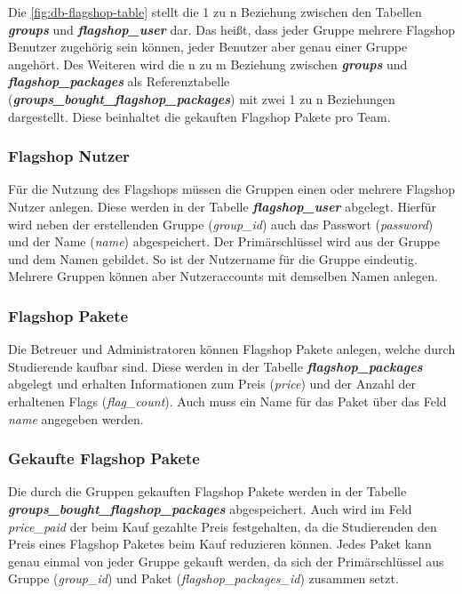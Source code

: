Die \autoref{fig:db-flagshop-table} stellt die 1 zu n Beziehung zwischen den Tabellen \textbf{\textit{groups}} und \textbf{\textit{flagshop\_user}} dar. Das heißt, dass jeder Gruppe mehrere Flagshop Benutzer zugehörig sein können, jeder Benutzer aber genau einer Gruppe angehört. Des Weiteren wird die n zu m Beziehung zwischen \textbf{\textit{groups}} und \textbf{\textit{flagshop\_packages}} als Referenztabelle\\ (\textbf{\textit{groups\_bought\_flagshop\_packages}}) mit zwei 1 zu n Beziehungen dargestellt. Diese beinhaltet die gekauften Flagshop Pakete pro Team.

\subsubsection{Flagshop Nutzer}
Für die Nutzung des Flagshops müssen die Gruppen einen oder mehrere Flagshop Nutzer anlegen. Diese werden in der Tabelle \textbf{\textit{flagshop\_user}} abgelegt. Hierfür wird neben der erstellenden Gruppe (\textit{group\_id}) auch das Passwort (\textit{password}) und der Name (\textit{name})  abgespeichert. Der Primärschlüssel wird aus der Gruppe und dem Namen gebildet. So ist der Nutzername für die Gruppe eindeutig. Mehrere Gruppen können aber Nutzeraccounts mit demselben Namen anlegen.

\subsubsection{Flagshop Pakete}
Die Betreuer und Administratoren können Flagshop Pakete anlegen, welche durch Studierende kaufbar sind. Diese werden in der Tabelle \textbf{\textit{flagshop\_packages}} abgelegt und erhalten Informationen zum Preis (\textit{price}) und der Anzahl der erhaltenen Flags (\textit{flag\_count}). Auch muss ein Name für das Paket über das Feld \textit{name} angegeben werden.

\subsubsection{Gekaufte Flagshop Pakete}
Die durch die Gruppen gekauften Flagshop Pakete werden in der Tabelle\\ \textbf{\textit{groups\_bought\_flagshop\_packages}} abgespeichert. Auch wird im Feld \textit{price\_paid} der beim Kauf gezahlte Preis festgehalten, da die Studierenden den Preis eines Flagshop Paketes beim Kauf reduzieren können. Jedes Paket kann genau einmal von jeder Gruppe gekauft werden, da sich der Primärschlüssel aus Gruppe (\textit{group\_id}) und Paket (\textit{flagshop\_packages\_id}) zusammen setzt.

